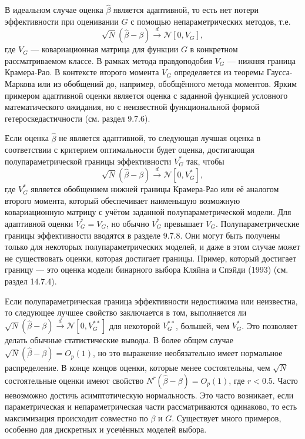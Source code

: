 В идеальном случае оценка $\hat{\beta}$ является адаптивной, то есть нет потери эффективности при оценивании $G$ с помощью непараметрических методов, т.е.
\[
\sqrt{N}(\hat{\beta} - \beta) \stackrel{d}{\rightarrow} \mathcal{N}[0,V_G],
\]
где $V_G$ --- ковариационная матрица для функции $G$ в конкретном рассматриваемом классе. В рамках метода правдоподобия $V_G$ --- нижняя граница Крамера-Рао. В контексте второго момента $V_G$ определяется из теоремы Гаусса-Маркова или из обобщений до, например, обобщённого метода моментов. Ярким примером адаптивной оценки является оценка с заданной функцией условного математического ожидания, но с неизвестной функциональной формой гетероскедастичности (см. раздел 9.7.6).

Если оценка $\hat{\beta}$ не является адаптивной, то следующая лучшая оценка в соответствии с критерием оптимальности будет оценка, достигающая полупараметрической границы эффективности $V_G^*$ так, чтобы
\[
\sqrt{N}(\hat{\beta} - \beta) \stackrel{d}{\rightarrow} \mathcal{N}[0,V_G^*],
\]
где $V_G^*$ является обобщением нижней границы Крамера-Рао или её аналогом второго момента, который обеспечивает наименьшую возможную ковариационную матрицу с учётом заданной полупараметрической модели. Для адаптивной оценки $V_G^* = V_G$, но обычно $V_G^*$ превышает $V_G$. Полупараметрические границы эффективности вводятся в разделе 9.7.8. Они могут быть получены только для некоторых полупараметрических моделей, и даже в этом случае может не существовать оценки, которая достигает границы. Пример, который достигает границу --- это оценка модели бинарного выбора Кляйна и Спэйди (1993) (см. раздел 14.7.4).

Если полупараметрическая граница эффективности недостижима или неизвестна, то следующее лучшее свойство заключается в том, выполняется ли $\sqrt{N}(\hat{\beta} - \beta) \stackrel{d}{\rightarrow} \mathcal{N}[0,V_G^{**}]$ для некоторой $V_G^{**}$, большей, чем $V_G^*$. Это позволяет делать обычные статистические выводы. В более общем случае $\sqrt{N}(\hat{\beta} - \beta) = O_p(1)$, но это выражение необязательно имеет нормальное распределение. В конце концов оценки, которые менее состоятельны, чем $\sqrt{N}$ состоятельные оценки имеют свойство $N^r(\hat{\beta} - \beta) = O_p(1)$, где $r < 0.5$. Часто невозможно достичь асимптотическую нормальность. Это часто возникает, если параметрическая и непараметрическая части рассматриваются одинаково, то есть максимизация происходит совместно по $\beta$ и $G$. Существует много примеров, особенно для дискретных и усечённых моделей выбора.

